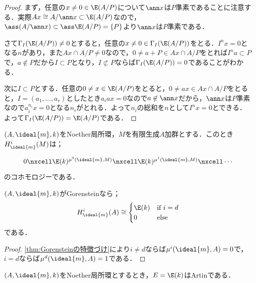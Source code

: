 \begin{proof}
	まず，任意の$x\neq 0\in\E(A/P)$について$\ann x$は$P$準素であることに注意する．実際$Ax\cong A/\ann x\subset\E(A/P)$なので，$\ass (A/\ann x)\subset\ass \E(A/P)=\{P\}$より$\ann x$は$P$準素である．
	
	さて$\Gamma_I(\E(A/P))\neq 0$とすると，任意の$x\neq 0\in\Gamma_I(\E(A/P))$をとる．$I^nx=0$となる$n$があり，また$Ax\cap A/P\neq 0$なので，$0\neq a+P\in Ax\cap A/P$をとれば$I^na\subset P$で，$a\not\in P$だから$I\subset P$となり，$I\not\subset P$ならば$\Gamma_I(\E(A/P))=0$であることがわかる．
	
	次に$I\subset P$とする．任意の$0\neq x\in \E(A/P)$をとると，$0\neq ax\in Ax\cap A/P$をとると，$I=(a_1,\dots,a_r)$としたとき$a_iax=0$なので$a\not\in\ann x$だから，$\ann x$は$P$準素なので$a_i^{n_i}x=0$となる$n_i$がとれる．よって$n_i$の総和を$n$として$I^nx=0$とできる．よって$\Gamma_I(\E(A/P))=\E(A/P)$である．
\end{proof}

\begin{cor}\label{cor:極大イデアルについての局所コホモロジー}
	$(A,\ideal{m},k)$をNoether局所環，$M$を有限生成$A$加群とする．このとき$H^i_{\ideal{m}}(M)$は；
	\[\begin{tikzcd}
		0\nxcell\E(k)^{\mu^0(\ideal{m},M)}\nxcell\E(k)^{\mu^1(\ideal{m},M)}\nxcell\cdots
	\end{tikzcd}\]
	のコホモロジーである．
\end{cor}

\begin{cor}\label{cor:Gorenstein環の局所コホモロジー}
	$(A,\ideal{m},k)$がGorensteinなら；
	\[H^i_{\ideal{m}}(A)\cong
		\begin{cases}
			\E(k)&\text{if~$i=d$}\\
			0&\text{else}
		\end{cases}\]
	である．
\end{cor}

\begin{proof}
	\ref{thm:Gorensteinの特徴づけ}により$i\neq d$ならば$\mu^i(\ideal{m},A)=0$で，$i=d$ならば$\mu^d(\ideal{m},A)=1$である．
\end{proof}

\begin{thm}\label{thm:Noether局所環の入射包絡はArtin}
	$(A,\ideal{m},k)$をNoether局所環とするとき，$E=\E(k)$はArtinである．
\end{thm}

